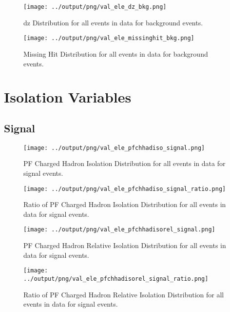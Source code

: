 \documentclass[11pt]{book}
\begin{document}
\begin{figure}[htb]
\centering
\texttt{[image: ../output/png/val\_ele\_dz\_bkg.png]}
\caption{dz Distribution for all events in data for background events.}
\label{fig:val_ele_dz_bkg}
\end{figure}

\begin{figure}[htb]
\centering
\texttt{[image: ../output/png/val\_ele\_missinghit\_bkg.png]}
\caption{Missing Hit Distribution for all events in data for background events.}
\label{fig:val_ele_missinghit_bkg}
\end{figure}
\clearpage


\chapter{Isolation Variables}

\section{Signal}
\begin{figure}[htb]
\centering
\texttt{[image: ../output/png/val\_ele\_pfchhadiso\_signal.png]}
\caption{PF Charged Hadron Isolation Distribution for all events in data for signal events.}
\label{fig:val_ele_pfchhadiso_signal}
\end{figure}

\begin{figure}[htb]
\centering
\texttt{[image: ../output/png/val\_ele\_pfchhadiso\_signal\_ratio.png]}
\caption{Ratio of PF Charged Hadron Isolation Distribution for all events in data for signal events.}
\label{fig:val_ele_pfchhadiso_signal_ratio}
\end{figure}

\begin{figure}[htb]
\centering
\texttt{[image: ../output/png/val\_ele\_pfchhadisorel\_signal.png]}
\caption{PF Charged Hadron Relative Isolation Distribution for all events in data for signal events.}
\label{fig:val_ele_pfchhadisorel_signal}
\end{figure}

\begin{figure}[htb]
\centering
\texttt{[image: ../output/png/val\_ele\_pfchhadisorel\_signal\_ratio.png]}
\caption{Ratio of PF Charged Hadron Relative Isolation Distribution for all events in data for signal events.}
\label{fig:val_ele_pfchhadisorel_signal_ratio}
\end{figure}
\end{document}
